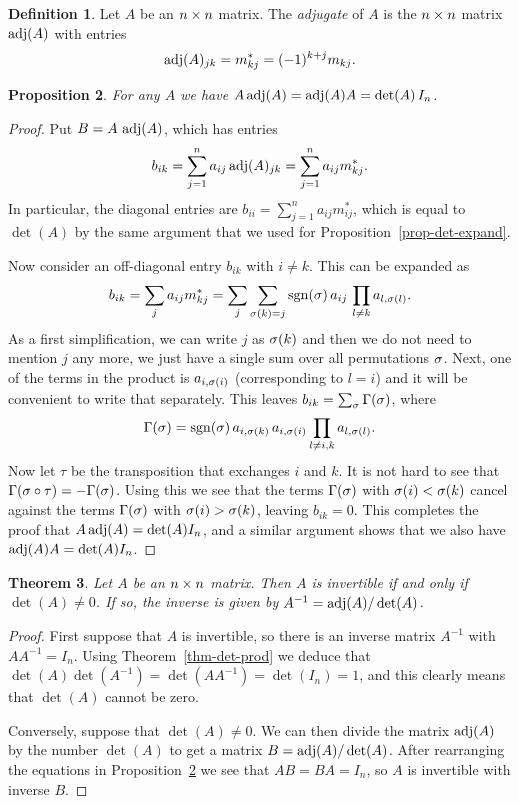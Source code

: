 \documentclass[reqno]{amsart}
\newtheorem{theorem}{Theorem}[section]
\newtheorem{proposition}[theorem]{Proposition}
\theoremstyle{definition}
\newtheorem{definition}[theorem]{Definition}
\newcommand{\dfn}[1]{\emph{{#1}}\index{#1}}
\begin{document}
\begin{definition}\label{defn-adjugate}
 Let $A$ be an $n\times n$ matrix.  The \dfn{adjugate} of $A$ is the
 $n\times n$ matrix $\operatorname{adj}(A)$ with entries
 \[ \operatorname{adj}(A)_{jk} = m^*_{kj} = (-1)^{k+j}m_{kj}. \]
\end{definition}

\begin{proposition}\label{prop-adjugate}
 For any $A$ we have $A\operatorname{adj}(A)=\operatorname{adj}(A)A=\det(A)\,I_n$.
\end{proposition}
\begin{proof}
 Put $B=A\,\operatorname{adj}(A)$, which has entries
 \[ b_{ik}=\sum_{j=1}^n a_{ij}\operatorname{adj}(A)_{jk}=\sum_{j=1}^na_{ij}m^*_{kj}. \]
 In particular, the diagonal entries are
 $b_{ii}=\sum_{j=1}^na_{ij}m^*_{ij}$, which is equal to $\det(A)$ by
 the same argument that we used for Proposition~\ref{prop-det-expand}.

 Now consider an off-diagonal entry $b_{ik}$ with $i\neq k$.  This can
 be expanded as
 \[ b_{ik} = \sum_j a_{ij}m^*_{kj} =
     \sum_j \sum_{\sigma(k)=j} \operatorname{sgn}(\sigma)\,a_{ij}\, \prod_{l\neq k} a_{l,\sigma(l)}.
 \]
 As a first simplification, we can write $j$ as $\sigma(k)$ and then we
 do not need to mention $j$ any more, we just have a single sum over
 all permutations $\sigma$.  Next, one of the terms in the product is
 $a_{i,\sigma(i)}$ (corresponding to $l=i$) and it will be convenient to
 write that separately.  This leaves $b_{ik}=\sum_\sigma\Gamma(\sigma)$, where
 \[ \Gamma(\sigma) =  \operatorname{sgn}(\sigma)\,a_{i,\sigma(k)}\,a_{i,\sigma(i)}
      \prod_{l\neq i,k} a_{l,\sigma(l)}.
 \]
 Now let $\tau$ be the transposition that exchanges $i$ and $k$.   It
 is not hard to see that $\Gamma(\sigma\circ\tau)=-\Gamma(\sigma)$.  Using this we
 see that the terms $\Gamma(\sigma)$ with $\sigma(i)<\sigma(k)$ cancel against the
 terms $\Gamma(\sigma)$ with $\sigma(i)>\sigma(k)$, leaving $b_{ik}=0$.  This
 completes the proof that $A\operatorname{adj}(A)=\det(A) I_n$, and a similar
 argument shows that we also have $\operatorname{adj}(A)A=\det(A)I_n$.
\end{proof}

\begin{theorem}\label{thm-inv-det}
 Let $A$ be an $n\times n$ matrix.  Then $A$ is invertible if and only if
 $\det(A)\neq 0$.  If so, the inverse is given by
 $A^{-1}=\operatorname{adj}(A)/\det(A)$.
\end{theorem}
\begin{proof}
 First suppose that $A$ is invertible, so there is an inverse matrix
 $A^{-1}$ with $AA^{-1}=I_n$.  Using Theorem~\ref{thm-det-prod} we
 deduce that $\det(A)\det(A^{-1})=\det(AA^{-1})=\det(I_n)=1$, and this
 clearly means that $\det(A)$ cannot be zero.

 Conversely, suppose that $\det(A)\neq 0$.  We can then divide the
 matrix $\operatorname{adj}(A)$ by the number $\det(A)$ to get a matrix
 $B=\operatorname{adj}(A)/\det(A)$.  After rearranging the equations in
 Proposition~\ref{prop-adjugate} we see that $AB=BA=I_n$, so $A$ is
 invertible with inverse $B$.
\end{proof}
\end{document}
